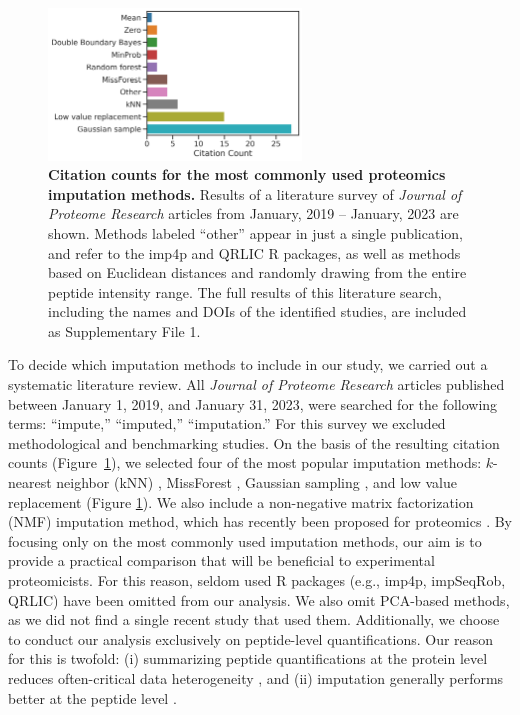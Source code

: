 \documentclass{article}
\begin{document}
\begin{figure}
  \begin{center}
    \includegraphics[width=0.6\textwidth]{figures/imp-lit-seq-results-update1.png}
  \end{center}
  \caption{{\bf Citation counts for the most commonly used proteomics imputation methods.} Results of a literature survey of \textit{Journal of Proteome Research} articles from January, 2019 -- January, 2023 are shown. Methods labeled ``other'' appear in just a single publication, and refer to the imp4p and QRLIC R packages, as well as methods based on Euclidean distances and randomly drawing from the entire peptide intensity range.  The full results of this literature search, including the names and DOIs of the identified studies, are included as Supplementary File 1. }
  \label{fig:citation-counts}
\end{figure} 

To decide which imputation methods to include in our study, we carried out a systematic literature review.  All \textit{Journal of Proteome Research} articles published between January 1, 2019, and January 31, 2023, were searched for the following terms: ``impute,'' ``imputed,'' ``imputation.'' For this survey we excluded methodological and benchmarking studies.  On the basis of the resulting citation counts (Figure~\ref{fig:citation-counts}), we selected four of the most popular imputation methods: $k$-nearest neighbor (kNN)  \cite{knn-impute}, MissForest \cite{missForest}, Gaussian sampling \cite{Perseus}, and low value replacement (Figure \ref{fig:citation-counts}).   We also include a non-negative matrix factorization (NMF) imputation method, which has recently been proposed for proteomics \cite{nmf-metabolomics, ms-impute, deep-impute}.  By focusing only on the most commonly used imputation methods, our aim is to provide a practical comparison that will be beneficial to experimental proteomicists. For this reason, seldom used R packages (e.g., imp4p, impSeqRob, QRLIC) have been omitted from our analysis. We also omit PCA-based methods, as we did not find a single recent study that used them. Additionally, we choose to conduct our analysis exclusively on peptide-level quantifications. Our reason for this is twofold: (i) summarizing peptide quantifications at the protein level reduces often-critical data heterogeneity \cite{humpty-dumpty}, and (ii) imputation generally performs better at the peptide level \cite{lazar}.
\end{document}
